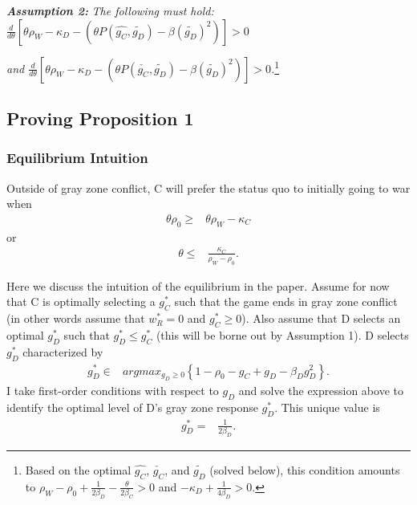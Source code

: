 \documentclass[
]{article}
\begin{document}
\textbf{\textit{ Assumption 2:}}\textit{ The following must hold: $\frac{d}{d\theta}\left[\theta\rho_{W}-\kappa_{D}-\left(\theta P(\hat{g_{C}},\tilde{g_{D}})-\beta(\tilde{g_{D}})^{2}\right)\right]>0$ }

\textit{ and $\frac{d}{d\theta}\left[\theta\rho_{W}-\kappa_{D}-\left(\theta P(\check{g_{C}},\tilde{g_{D}})-\beta(\tilde{g_{D}})^{2}\right)\right]>0$.}\footnote{Based on the optimal $\hat{g_{C}}$, $\check{g_{C}}$, and $\tilde{g_{D}}$ (solved below), this condition amounts to $\rho_{W}-\rho_{0}+\frac{1}{2\beta_{D}}-\frac{\theta}{2\beta_{C}}>0$ and $-\kappa_{D}+\frac{1}{4\beta_{D}}>0$. }

\hypertarget{proving-proposition-1}{%
\subsection{Proving Proposition 1}\label{proving-proposition-1}}

\hypertarget{equilibrium-intuition}{%
\subsubsection{Equilibrium Intuition}\label{equilibrium-intuition}}

Outside of gray zone conflict, C will prefer the status quo to initially going to war when
\begin{align*}
  \theta\rho_{0}\geq & \theta\rho_{W}-\kappa_{C}
  \end{align*}
or
\begin{align*}
  \theta\leq & \frac{\kappa_{C}}{\rho_{W}-\rho_{0}}.
  \end{align*}

Here we discuss the intuition of the equilibrium in the paper. Assume for now that C is optimally selecting a \(g_{C}^{*}\) such that the game ends in gray zone conflict (in other words assume that \(w_{R}^{*}=0\) and \(g_{C}^{*}\geq0\)). Also assume that D selects an optimal \(g_{D}^{*}\) such that \(g_{D}^{*}\leq g_{C}^{*}\) (this will be borne out by Assumption 1). D selects \(g_{D}^{*}\) characterized by
\begin{align*}
  g_{D}^{*}\in & argmax_{g_{D}\geq0}\left\{ 1-\rho_{0}-g_{C}+g_{D}-\beta_{D}g_{D}^{2}\right\}.
  \end{align*}
I take first-order conditions with respect to \(g_{D}\) and solve the expression above to identify the optimal level of D's gray zone response \(g_{D}^{*}\). This unique value is
\begin{align*}
  g_{D}^{*}= & \frac{1}{2\beta_{D}}.
  \end{align*}
\end{document}
